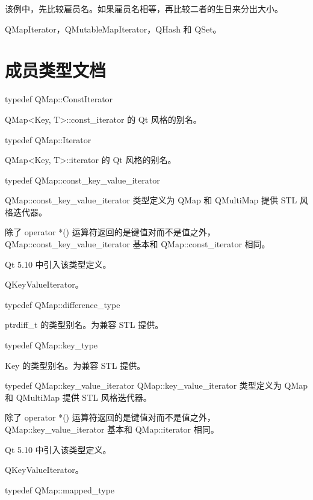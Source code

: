 该例中，先比较雇员名。如果雇员名相等，再比较二者的生日来分出大小。

\begin{seeAlso}
QMapIterator，QMutableMapIterator，QHash 和 QSet。
\end{seeAlso}

\section{成员类型文档}

typedef QMap::ConstIterator

QMap<Key, T>::const\_iterator 的 Qt 风格的别名。

\splitLine

typedef QMap::Iterator

QMap<Key, T>::iterator 的 Qt 风格的别名。

\splitLine

typedef QMap::const\_key\_value\_iterator

QMap::const\_key\_value\_iterator 类型定义为 QMap 和 QMultiMap 提供 STL 风格迭代器。

除了 operator *() 运算符返回的是键值对而不是值之外，QMap::const\_key\_value\_iterator 基本和 QMap::const\_iterator 相同。

Qt 5.10 中引入该类型定义。

\begin{seeAlso}
QKeyValueIterator。
\end{seeAlso}

\splitLine

typedef QMap::difference\_type

ptrdiff\_t 的类型别名。为兼容 STL 提供。

typedef QMap::key\_type

Key 的类型别名。为兼容 STL 提供。

\splitLine

typedef QMap::key\_value\_iterator
QMap::key\_value\_iterator 类型定义为 QMap 和 QMultiMap 提供 STL 风格迭代器。

除了 operator *() 运算符返回的是键值对而不是值之外，QMap::key\_value\_iterator 基本和 QMap::iterator 相同。

Qt 5.10 中引入该类型定义。

\begin{seeAlso}
QKeyValueIterator。
\end{seeAlso}

\splitLine

typedef QMap::mapped\_type

